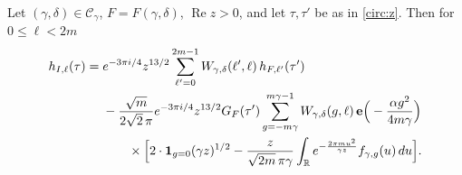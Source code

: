 \begin{proposition}\label{circ:prop:arc}
Let $(\gamma,\delta)\in\mathcal C_\gamma$, $F=F(\gamma,\delta)$, $\operatorname{Re}z>0$, and let $\tau,\tau'$ be as in \eqref{circ:z}. Then for $0\le\ell<2m$
\begin{equation}\label{circ:arcformula}
\begin{aligned}
h_{I,\ell}(\tau)={}&e^{-3\pi i/4}z^{13/2}\sum_{\ell'=0}^{2m-1}W_{\gamma,\delta}(\ell',\ell)\,h_{F,\ell'}(\tau')\\
&-\frac{\sqrt m}{2\sqrt2\,\pi}e^{-3\pi i/4}z^{13/2}G_F(\tau')\sum_{g=-m\gamma}^{m\gamma-1}W_{\gamma,\delta}(g,\ell)\,\mathbf e\Big(-\frac{\alpha g^2}{4m\gamma}\Big)\\
&\qquad\times\Big[2\cdot\mathbf 1_{g=0}(\gamma z)^{1/2}-\frac z{\sqrt{2m}\,\pi\gamma}\int_{\mathbb{R}} e^{-\frac{2\pi mu^2}{\gamma z}}f_{\gamma,g}(u)\,du\Big].
\end{aligned}
\end{equation}
\end{proposition}

